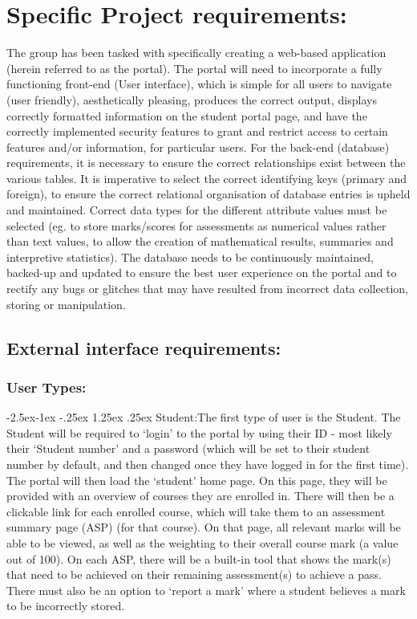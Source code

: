 \documentclass[paper=a4, fontsize=11pt]{scrartcl}
\makeatletter
\numberwithin{equation}{section}		%
\numberwithin{figure}{section}			%
\numberwithin{table}{section}				%
\renewcommand\paragraph{\@startsection{paragraph}{4}{\z@}%
            {-2.5ex\@plus -1ex \@minus -.25ex}%
            {1.25ex \@plus .25ex}%
            {\normalfont\normalsize\bfseries}}
\makeatother
\begin{document}
\section{Specific Project requirements:}
The group has been tasked with specifically creating a web-based application (herein
referred to as the portal). The portal will need to incorporate a fully functioning front-end
(User interface), which is simple for all users to navigate (user friendly), aesthetically
pleasing, produces the correct output, displays correctly formatted information on the student
portal page, and have the correctly implemented security features to grant and restrict
access to certain features and/or information, for particular users.
For the back-end (database) requirements, it is necessary to ensure the correct relationships
exist between the various tables. It is imperative to select the correct identifying keys
(primary and foreign), to ensure the correct relational organisation of database entries is
upheld and maintained. Correct data types for the different attribute values must be selected
(eg. to store marks/scores for assessments as numerical values rather than text values, to
allow the creation of mathematical results, summaries and interpretive statistics). The
database needs to be continuously maintained, backed-up and updated to ensure the best
user experience on the portal and to rectify any bugs or glitches that may have resulted from
incorrect data collection, storing or manipulation.
\\
\subsection{External interface requirements:}

\subsubsection{User Types:}
\paragraph{Student:}The first type of user is the Student. The Student will be required to ‘login’
to the portal by using their ID - most likely their ‘Student number’ and a
password (which will be set to their student number by default, and then
changed once they have logged in for the first time). The portal will then
load the ‘student’ home page. On this page, they will be provided with an
overview of courses they are enrolled in. There will then be a clickable
link for each enrolled course, which will take them to an assessment
summary page (ASP) (for that course). On that page, all relevant marks
will be able to be viewed, as well as the weighting to their overall course
mark (a value out of 100). On each ASP, there will be a built-in tool that
shows the mark(s) that need to be achieved on their remaining
assessment(s) to achieve a pass. There must also be an option to ‘report
a mark’ where a student believes a mark to be incorrectly stored.
\end{document}
